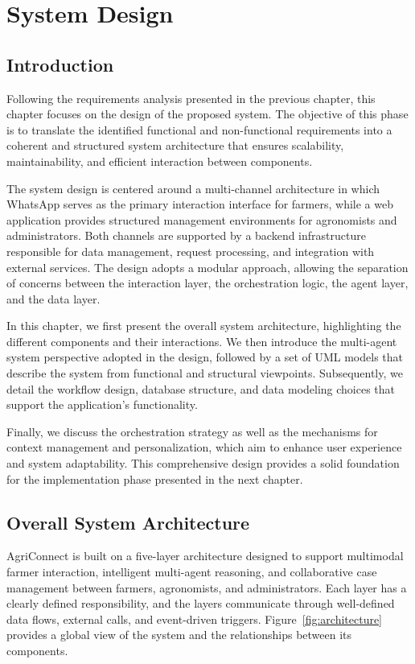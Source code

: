 \chapter{System Design}

\section{Introduction}

Following the requirements analysis presented in the previous chapter, this chapter focuses on the design of the proposed system. The objective of this phase is to translate the identified functional and non-functional requirements into a coherent and structured system architecture that ensures scalability, maintainability, and efficient interaction between components.

The system design is centered around a multi-channel architecture in which WhatsApp serves as the primary interaction interface for farmers, while a web application provides structured management environments for agronomists and administrators. Both channels are supported by a backend infrastructure responsible for data management, request processing, and integration with external services. The design adopts a modular approach, allowing the separation of concerns between the interaction layer, the orchestration logic, the agent layer, and the data layer.

In this chapter, we first present the overall system architecture, highlighting the different components and their interactions. We then introduce the multi-agent system perspective adopted in the design, followed by a set of UML models that describe the system from functional and structural viewpoints. Subsequently, we detail the workflow design, database structure, and data modeling choices that support the application's functionality.

Finally, we discuss the orchestration strategy as well as the mechanisms for context management and personalization, which aim to enhance user experience and system adaptability. This comprehensive design provides a solid foundation for the implementation phase presented in the next chapter.

\section{Overall System Architecture}

AgriConnect is built on a five-layer architecture designed to support multimodal farmer interaction, intelligent multi-agent reasoning, and collaborative case management between farmers, agronomists, and administrators. Each layer has a clearly defined responsibility, and the layers communicate through well-defined data flows, external calls, and event-driven triggers. Figure~\ref{fig:architecture} provides a global view of the system and the relationships between its components.

